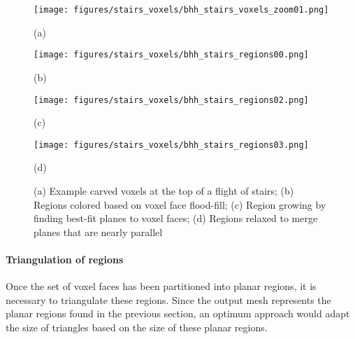 \documentclass[10pt,twocolumn,letterpaper]{article}
\begin{document}
\begin{figure}[t]

	\begin{minipage}[b]{0.45\linewidth}
	\centerline{\texttt{[image: figures/stairs\_voxels/bhh\_stairs\_voxels\_zoom01.png]}}
	\centerline{(a)}\medskip
	\end{minipage}
	\hfill
	\begin{minipage}[b]{0.45\linewidth}
	\centerline{\texttt{[image: figures/stairs\_voxels/bhh\_stairs\_regions00.png]}}
	\centerline{(b)}\medskip
	\end{minipage}
	\begin{minipage}[b]{0.45\linewidth}
	\centerline{\texttt{[image: figures/stairs\_voxels/bhh\_stairs\_regions02.png]}}
	\centerline{(c)}\medskip
	\end{minipage}
	\hfill
	\begin{minipage}[b]{0.45\linewidth}
	\centerline{\texttt{[image: figures/stairs\_voxels/bhh\_stairs\_regions03.png]}}
	\centerline{(d)}\medskip
	\end{minipage}

	\caption{(a) Example carved voxels at the top of a flight of stairs; (b) Regions colored based on voxel face flood-fill; (c) Region growing by finding best-fit planes to voxel faces; (d) Regions relaxed to merge planes that are nearly parallel}
	\label{fig:stairs_voxels}
\end{figure}

\paragraph*{Triangulation of regions}

Once the set of voxel faces has been partitioned into planar regions, it is necessary to triangulate these regions.  Since the output mesh represents the planar regions found in the previous section, an optimum approach would adapt the size of triangles based on the size of these planar regions.
\end{document}
